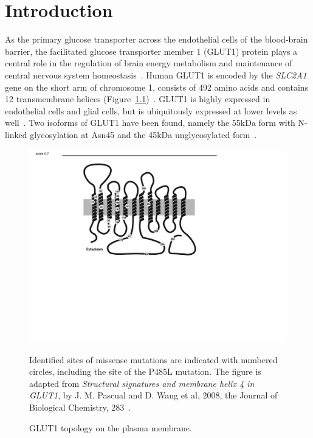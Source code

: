 
\chapter{Introduction} %
\label{Chapter1} %

As the primary glucose transporter across the endothelial cells of the blood-brain barrier, the facilitated glucose transporter member 1 (GLUT1) protein plays a central role in the regulation of brain energy metabolism and maintenance of central nervous system homeostasis~\cite{Pascual}. Human GLUT1 is encoded by the \textit{SLC2A1} gene on the short arm of chromosome 1, consists of 492 amino acids and contains 12 transmembrane \textalpha{} helices (Figure~\ref{fig:topo})~\cite{MUECKLER,Uldry}. GLUT1 is highly expressed in endothelial cells and glial cells, but is ubiquitously expressed at lower levels as well~\cite{Lee,Wheeler}. Two isoforms of GLUT1 have been found, namely the 55kDa form with N-linked glycosylation at Asn45 and the 45kDa unglycosylated form~\cite{Paul-W.-Hruz,Duelli}.
\begin{figure}[h]
\centering
\includegraphics[scale=0.7]{Figures/topology}
\caption{GLUT1 topology on the plasma membrane.}
\vspace*{-3mm}
\small \justify
Identified sites of missense mutations are indicated with numbered circles, including the site of the P485L mutation. The figure is adapted from \textit{Structural signatures and membrane helix 4 in GLUT1}, by J. M. Pascual and D. Wang et al, 2008, the Journal of Biological Chemistry, 283~\cite{Pascual}.
\label{fig:topo}
\end{figure}

